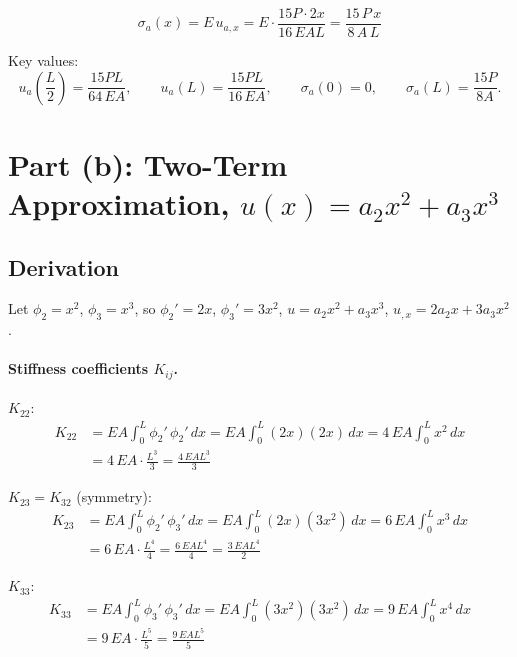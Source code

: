 \documentclass[11pt, a4paper]{article}
\begin{document}
\begin{equation}\label{eq:sigma_a}
\sigma_a(x) = E\,u_{a,x} = E\cdot\frac{15P\cdot 2x}{16\,EAL} = \frac{15\,P\,x}{8\,A\,L}
\end{equation}

\noindent Key values:
\[
u_a\!\left(\frac{L}{2}\right) = \frac{15PL}{64\,EA},\qquad
u_a(L) = \frac{15PL}{16\,EA},\qquad
\sigma_a(0) = 0,\qquad
\sigma_a(L) = \frac{15P}{8A}.
\]

\section{Part (b): Two-Term Approximation, \texorpdfstring{$u(x) = a_2 x^2 + a_3 x^3$}{u(x)=a2 x2+a3 x3}}\label{sec:partb}

\subsection{Derivation}

Let $\phi_2=x^2$, $\phi_3=x^3$, so $\phi_2'=2x$, $\phi_3'=3x^2$, $u=a_2 x^2+a_3 x^3$, $u_{,x}=2a_2 x+3a_3 x^2$.

\paragraph{Stiffness coefficients $K_{ij}$.}

\noindent$K_{22}$:
\begin{align*}
K_{22} &= EA\int_0^L \phi_2'\,\phi_2'\,dx
       = EA\int_0^L (2x)(2x)\,dx
       = 4\,EA\int_0^L x^2\,dx \\[4pt]
       &= 4\,EA\cdot\frac{L^3}{3}
       = \frac{4\,EAL^3}{3}
\end{align*}

\noindent$K_{23}=K_{32}$ (symmetry):
\begin{align*}
K_{23} &= EA\int_0^L \phi_2'\,\phi_3'\,dx
       = EA\int_0^L (2x)(3x^2)\,dx
       = 6\,EA\int_0^L x^3\,dx \\[4pt]
       &= 6\,EA\cdot\frac{L^4}{4}
       = \frac{6\,EAL^4}{4}
       = \frac{3\,EAL^4}{2}
\end{align*}

\noindent$K_{33}$:
\begin{align*}
K_{33} &= EA\int_0^L \phi_3'\,\phi_3'\,dx
       = EA\int_0^L (3x^2)(3x^2)\,dx
       = 9\,EA\int_0^L x^4\,dx \\[4pt]
       &= 9\,EA\cdot\frac{L^5}{5}
       = \frac{9\,EAL^5}{5}
\end{align*}
\end{document}
